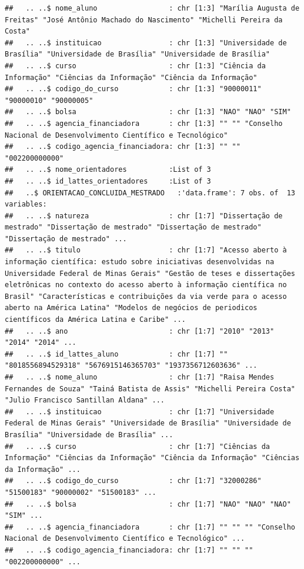 \documentclass[]{article}
\begin{document}
\begin{verbatim}
##   .. ..$ nome_aluno                 : chr [1:3] "Marília Augusta de Freitas" "José Antônio Machado do Nascimento" "Michelli Pereira da Costa"
##   .. ..$ instituicao                : chr [1:3] "Universidade de Brasília" "Universidade de Brasília" "Universidade de Brasília"
##   .. ..$ curso                      : chr [1:3] "Ciência da Informação" "Ciências da Informação" "Ciência da Informação"
##   .. ..$ codigo_do_curso            : chr [1:3] "90000011" "90000010" "90000005"
##   .. ..$ bolsa                      : chr [1:3] "NAO" "NAO" "SIM"
##   .. ..$ agencia_financiadora       : chr [1:3] "" "" "Conselho Nacional de Desenvolvimento Científico e Tecnológico"
##   .. ..$ codigo_agencia_financiadora: chr [1:3] "" "" "002200000000"
##   .. ..$ nome_orientadores          :List of 3
##   .. ..$ id_lattes_orientadores     :List of 3
##   ..$ ORIENTACAO_CONCLUIDA_MESTRADO   :'data.frame': 7 obs. of  13 variables:
##   .. ..$ natureza                   : chr [1:7] "Dissertação de mestrado" "Dissertação de mestrado" "Dissertação de mestrado" "Dissertação de mestrado" ...
##   .. ..$ titulo                     : chr [1:7] "Acesso aberto à informação científica: estudo sobre iniciativas desenvolvidas na Universidade Federal de Minas Gerais" "Gestão de teses e dissertações eletrônicas no contexto do acesso aberto à informação científica no Brasil" "Características e contribuições da via verde para o acesso aberto na América Latina" "Modelos de negócios de periodicos científicos da América Latina e Caribe" ...
##   .. ..$ ano                        : chr [1:7] "2010" "2013" "2014" "2014" ...
##   .. ..$ id_lattes_aluno            : chr [1:7] "" "8018556894529318" "5676915146365703" "1937356712603636" ...
##   .. ..$ nome_aluno                 : chr [1:7] "Raisa Mendes Fernandes de Souza" "Tainá Batista de Assis" "Michelli Pereira Costa" "Julio Francisco Santillan Aldana" ...
##   .. ..$ instituicao                : chr [1:7] "Universidade Federal de Minas Gerais" "Universidade de Brasília" "Universidade de Brasília" "Universidade de Brasília" ...
##   .. ..$ curso                      : chr [1:7] "Ciências da Informação" "Ciências da Informação" "Ciência da Informação" "Ciências da Informação" ...
##   .. ..$ codigo_do_curso            : chr [1:7] "32000286" "51500183" "90000002" "51500183" ...
##   .. ..$ bolsa                      : chr [1:7] "NAO" "NAO" "NAO" "SIM" ...
##   .. ..$ agencia_financiadora       : chr [1:7] "" "" "" "Conselho Nacional de Desenvolvimento Científico e Tecnológico" ...
##   .. ..$ codigo_agencia_financiadora: chr [1:7] "" "" "" "002200000000" ...

\end{verbatim}
\end{document}
